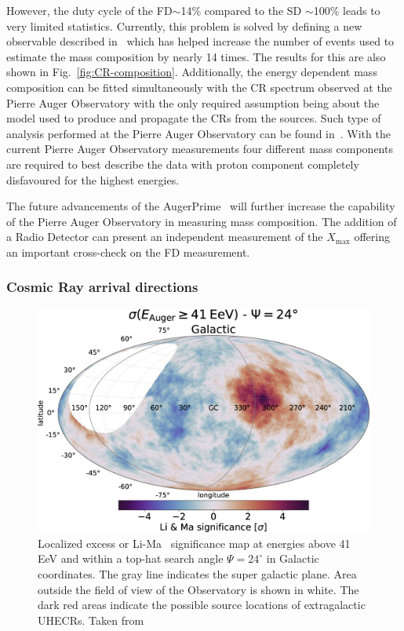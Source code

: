 However, the duty cycle of the \gls{FD}$\sim$14\% compared to the \gls{SD} $\sim$100\% leads to very limited statistics. Currently, this problem is solved by defining a new observable described in~\cite{2017arXiv171007249T} which has helped increase the number of events used to estimate the mass composition by nearly 14 times. The results for this are also shown in Fig.~\ref{fig:CR-composition}. Additionally, the energy dependent mass composition can be fitted simultaneously with the \gls{CR} spectrum observed at the Pierre Auger Observatory with the only required assumption being about the model used to produce and propagate the \glspl{CR} from the sources. Such type of analysis performed at the Pierre Auger Observatory can be found in~\cite{2018_auger_comp_spec}. With the current Pierre Auger Observatory measurements four different mass components are required to best describe the data with proton component completely disfavoured for the highest energies.

The future advancements of the AugerPrime~\cite{ANASTASI2022167497} will further increase the capability of the Pierre Auger Observatory in measuring mass composition. The addition of a Radio Detector can present an independent measurement of the $X_{\text{max}}$ offering an important cross-check on the \gls{FD} measurement. 

\subsubsection*{Cosmic Ray arrival directions}
\label{subsubsec:CRdirec}
\begin{figure}[t!]
  \centering
  \includegraphics[width=14.5cm]{thesis_figures/CRnNu/apjac7d4ef1_hr.jpg}
  \caption{Localized excess or Li-Ma~\cite{Li:1983fv} significance map at energies above 41 EeV and within a top-hat search angle $\Psi = 24^\circ$ in Galactic coordinates. The gray line indicates the super galactic plane. Area outside the field of view of the Observatory is shown in white. The dark red areas indicate the possible source locations of extragalactic \glspl{UHECR}. Taken from~\cite{Abreu_2022}}
  \label{fig:CR-anisotropy}
\end{figure}

